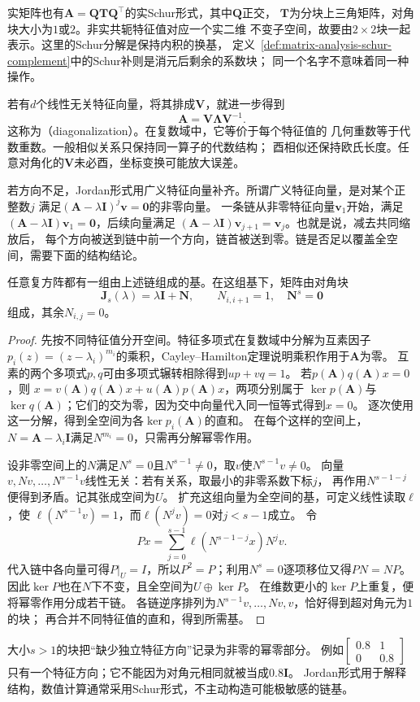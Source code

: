 实矩阵也有$\bm A=\bm Q\bm T\bm Q^\top$的实Schur形式，其中$\bm Q$正交，
$\bm T$为分块上三角矩阵，对角块大小为$1$或$2$。非实共轭特征值对应一个实二维
不变子空间，故要由$2\times2$块一起表示。这里的Schur分解是保持内积的换基，
定义~\ref{def:matrix-analysis-schur-complement}中的Schur补则是消元后剩余的系数块；
同一个名字不意味着同一种操作。

若有$d$个线性无关特征向量，将其排成$\bm V$，就进一步得到
\[
 \bm A=\bm V\bm\Lambda\bm V^{-1}.
\]
这称为（diagonalization）。在复数域中，它等价于每个特征值的
几何重数等于代数重数。一般相似关系只保持同一算子的代数结构；
酉相似还保持欧氏长度。任意对角化的$\bm V$未必酉，坐标变换可能放大误差。

若方向不足，Jordan形式用广义特征向量补齐。所谓广义特征向量，是对某个正整数$j$
满足$(\bm A-\lambda\bm I)^j\bm v=\bm0$的非零向量。
一条链从非零特征向量$\bm v_1$开始，满足
$(\bm A-\lambda\bm I)\bm v_1=\bm0$，后续向量满足
$(\bm A-\lambda\bm I)\bm v_{j+1}=\bm v_j$。也就是说，减去共同缩放后，
每个方向被送到链中前一个方向，链首被送到零。链是否足以覆盖全空间，需要下面的结构结论。
\begin{theorem}[复矩阵的Jordan链分解]
任意复方阵都有一组由上述链组成的基。在这组基下，矩阵由对角块
\[
 \bm J_s(\lambda)=\lambda\bm I+\bm N,\qquad
 N_{i,i+1}=1,\quad \bm N^s=\bm0
\]
组成，其余$N_{i,j}=0$。
\end{theorem}
\begin{proof}
先按不同特征值分开空间。特征多项式在复数域中分解为互素因子
$p_i(z)=(z-\lambda_i)^{m_i}$的乘积，Cayley--Hamilton定理说明乘积作用于$\bm A$为零。
互素的两个多项式$p,q$可由多项式辗转相除得到$up+vq=1$。
若$p(\bm A)q(\bm A)x=0$，则
$x=v(\bm A)q(\bm A)x+u(\bm A)p(\bm A)x$，两项分别属于
$\ker p(\bm A)$与$\ker q(\bm A)$；它们的交为零，因为交中向量代入同一恒等式得到$x=0$。
逐次使用这一分解，得到全空间为各$\ker p_i(\bm A)$的直和。
在每个这样的空间上，$N=\bm A-\lambda_i\bm I$满足$N^{m_i}=0$，只需再分解幂零作用。

设非零空间上的$N$满足$N^s=0$且$N^{s-1}\neq0$，取$v$使$N^{s-1}v\neq0$。
向量$v,Nv,\ldots,N^{s-1}v$线性无关：若有关系，取最小的非零系数下标$j$，
再作用$N^{s-1-j}$便得到矛盾。记其张成空间为$U$。
扩充这组向量为全空间的基，可定义线性读取$\ell$，使
$\ell(N^{s-1}v)=1$，而$\ell(N^jv)=0$对$j<s-1$成立。
令
\[
 P x=\sum_{j=0}^{s-1}\ell(N^{s-1-j}x)N^jv.
\]
代入链中各向量可得$P|_U=I$，所以$P^2=P$；利用$N^s=0$逐项移位又得$PN=NP$。
因此$\ker P$也在$N$下不变，且全空间为$U\oplus\ker P$。
在维数更小的$\ker P$上重复，便将幂零作用分成若干链。
各链逆序排列为$N^{s-1}v,\ldots,Nv,v$，恰好得到超对角元为$1$的块；
再合并不同特征值的直和，得到所需基。
\end{proof}
大小$s>1$的块把“缺少独立特征方向”记录为非零的幂零部分。
例如$\left[\begin{smallmatrix}0.8&1\\0&0.8\end{smallmatrix}\right]$
只有一个特征方向；它不能因为对角元相同就被当成$0.8\bm I$。
Jordan形式用于解释结构，数值计算通常采用Schur形式，不主动构造可能极敏感的链基。


